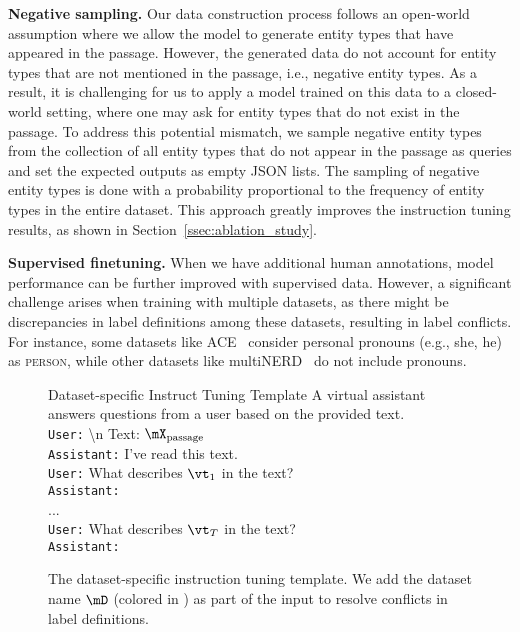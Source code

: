 \smallskip
\noindent\textbf{Negative sampling.}
Our data construction process follows an open-world assumption where we allow the model to generate entity types that have appeared in the passage.
However, the generated data do not account for entity types that are not mentioned in the passage, i.e., negative entity types.
As a result, it is challenging for us to apply a model trained on this data to a closed-world setting, where one may ask for entity types that do not exist in the passage.
To address this potential mismatch, we sample negative entity types from the collection of all entity types that do not appear in the passage as queries and set the expected outputs as empty JSON lists.
The sampling of negative entity types is done with a probability proportional to the frequency of entity types in the entire dataset.
This approach greatly improves the instruction tuning results, as shown in Section~\ref{ssec:ablation_study}.

\smallskip
\noindent\textbf{Supervised finetuning.} When we have additional human annotations, model performance can be further improved with supervised data.
However, a significant challenge arises when training with multiple datasets, as there might be discrepancies in label definitions among these datasets, resulting in label conflicts.
For instance, some datasets like ACE~\citep{walker2006ace} consider personal pronouns (e.g., she, he) as \textsc{person}, while other datasets like multiNERD~\citep{tedeschi-navigli-2022-multinerd} do not include pronouns.

\begin{wrapfigure}[13]{r}{0.5\textwidth}
    \vspace{-20pt}
    \begin{AIboxSmall}{\footnotesize Dataset-specific Instruct Tuning Template}
    \footnotesize
    A virtual assistant answers questions from a user based on the provided text.\\
    \texttt{User:}  \textbackslash n Text: $\mX_\text{passage}$\\
    \texttt{Assistant:} I've read this text.\\
    \texttt{User:} What describes $\vt_1$ in the text?\\
    \texttt{Assistant:} \\
    ...\\
    \texttt{User:} What describes $\vt_T$ in the text?\\
    \texttt{Assistant:} 
    \end{AIboxSmall}
    \caption{The dataset-specific instruction tuning template. We add the dataset name $\mD$ (colored in ) as part of the input to resolve conflicts in label definitions.}
    \label{fig:supervised_input_in_conv}
\end{wrapfigure}

